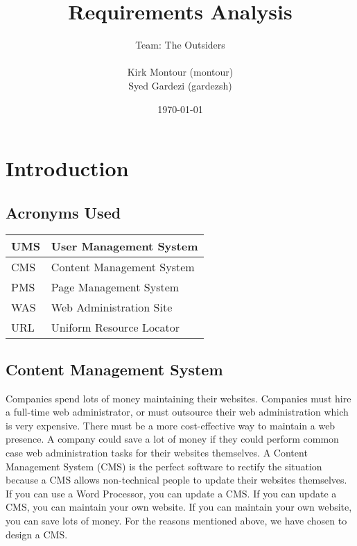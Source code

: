 \documentclass[11pt]{article}
\begin{document}
\title{Requirements Analysis} 
\author{Team: The Outsiders\\ \\ Kirk Montour (montour)\\ Syed Gardezi (gardezsh)}
\date{\today}
  
\maketitle

\pagebreak

\tableofcontents

\pagebreak

\section{Introduction}

\subsection{Acronyms Used}

\begin{table}[H]
\centering
\begin{tabular}{|l|l|}
\hline
UMS & User Management System    \\ \hline
CMS & Content Management System \\ \hline
PMS & Page Management System    \\ \hline
WAS & Web Administration Site   \\ \hline
URL & Uniform Resource Locator  \\ \hline
\end{tabular}
\end{table}


\subsection{Content Management System}
Companies spend lots of money maintaining their websites. Companies must hire a full-time web administrator, or must outsource their web administration which is very expensive. There must be a more cost-effective way to maintain a web presence. A company could save a lot of money if they could perform common case web administration tasks for their websites themselves. A Content Management System (CMS) is the perfect software to rectify the situation because a CMS allows non-technical people to update their websites themselves. If you can use a Word Processor, you can update a CMS. If you can update a CMS, you can maintain your own website. If you can maintain your own website, you can save lots of money. For the reasons mentioned above, we have chosen to design a CMS.
\end{document}
